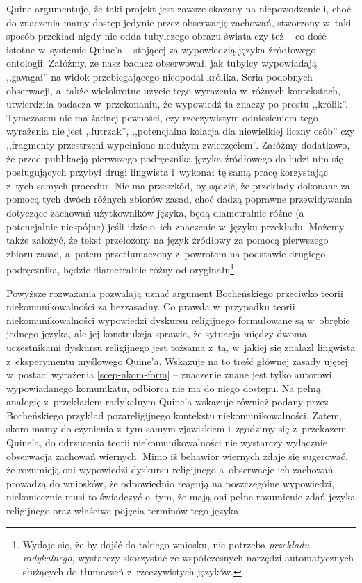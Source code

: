 Quine argumentuje, że taki projekt jest zawsze skazany na niepowodzenie i, choć do znaczenia mamy dostęp jedynie przez obserwację zachowań, stworzony w~taki sposób przekład nigdy nie odda tubylczego obrazu świata czy też -- co dość istotne w~systemie Quine'a -- stojącej za wypowiedzią języka źródłowego ontologii. Załóżmy, że nasz badacz obserwował, jak tubylcy wypowiadają ,,gavagai'' na widok przebiegającego nieopodal królika. Seria podobnych obserwacji, a~także wielokrotne użycie tego wyrażenia w~różnych kontekstach, utwierdziła badacza w~przekonaniu, że wypowiedź ta znaczy po prostu ,,królik''. Tymczasem nie ma żadnej pewności, czy rzeczywistym odniesieniem tego wyrażenia nie jest ,,futrzak'', ,,potencjalna kolacja dla niewielkiej liczny osób'' czy ,,fragmenty przestrzeni wypełnione niedużym zwierzęciem''. Załóżmy dodatkowo, że przed publikacją pierwszego podręcznika języka źródłowego do ludzi nim się posługujących przybył drugi lingwista i~wykonał tę samą pracę korzystając z~tych samych procedur. Nie ma przeszkód, by sądzić, że przekłady dokonane za pomocą tych dwóch różnych zbiorów zasad, choć dadzą poprawne przewidywania dotyczące zachowań użytkowników języka, będą diametralnie różne (a potencjalnie niespójne) jeśli idzie o~ich znaczenie w~języku przekładu. Możemy także założyć, że tekst przełożony na język źródłowy za pomocą pierwszego zbioru zasad, a~potem przetłumaczony z~powrotem na podstawie drugiego podręcznika, będzie diametralnie różny od oryginału\footnote{Wydaje się, że by dojść do takiego wniosku, nie potrzeba \textit{przekładu radykalnego}, wystarczy skorzystać ze współczesnych narzędzi automatycznych służących do tłumaczeń z~rzeczywistych języków.}.

Powyższe rozważania pozwalają uznać argument Bocheńskiego przeciwko teorii niekomunikowalności za bezzasadny. Co prawda w~przypadku teorii niekomunikowalności wypowiedzi dyskursu religijnego formułowane są w~obrębie jednego języka, ale jej konstrukcja sprawia, że sytuacja między dwoma uczestnikami dyskursu religijnego jest tożsama z~tą, w~jakiej się znalazł lingwista z~eksperymentu myślowego Quine'a. Wskazuje na to treść głównej zasady ujętej w~postaci wyrażenia \eqref{scep-nkom-form} -- znaczenie znane jest tylko autorowi wypowiadanego komunikatu, odbiorca nie ma do niego dostępu. Na pełną analogię z~przekładem radykalnym Quine'a wskazuje również podany przez Bocheńskiego przykład pozareligijnego kontekstu niekomunikowalności. Zatem, skoro mamy do czynienia z~tym samym zjawiskiem i~zgodzimy się z~przekazem Quine'a, do odrzucenia teorii niekomunikowalności nie wystarczy wyłącznie obserwacja zachowań wiernych. Mimo iż behawior wiernych zdaje się sugerować, że rozumieją oni wypowiedzi dyskursu religijnego a~obserwacje ich zachowań prowadzą do wniosków, że odpowiednio reagują na poszczególne wypowiedzi, niekoniecznie musi to świadczyć o~tym, że mają oni pełne rozumienie zdań języka religijnego oraz właściwe pojęcia terminów tego języka.

